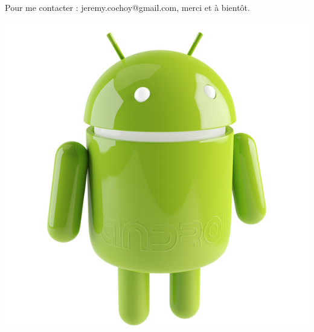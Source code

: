 \documentclass{beamer}
\begin{document}
\begin{frame}
\begin{center}
Pour me contacter : jeremy.cochoy@gmail.com, merci et à bientôt.

\medskip
\medskip
\medskip
\medskip

\includegraphics[scale=0.3]{android.jpg}
\end{center}
\end{frame}
\end{document}
